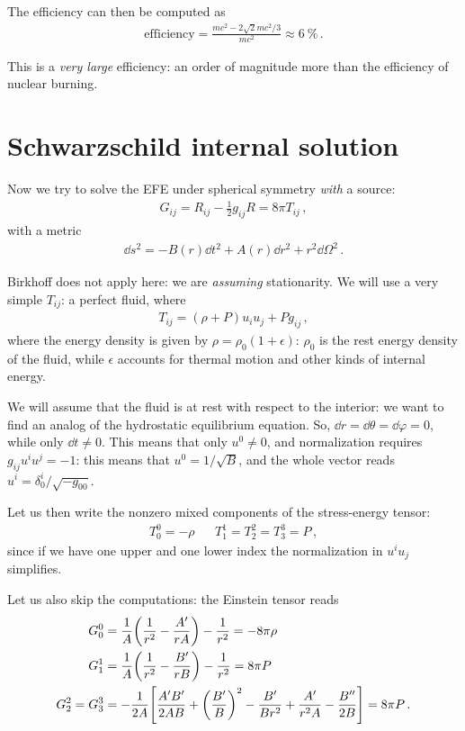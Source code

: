\documentclass[main.tex]{subfiles}
\begin{document}
The efficiency can then be computed as 
%
\begin{align}
\text{efficiency} = \frac{mc^2 - 2 \sqrt{2} mc^2 / 3}{mc^2} \approx \SI{6}{\percent}
\,.
\end{align}

This is a \emph{very large} efficiency: an order of magnitude more than the efficiency of nuclear burning. 

\section{Schwarzschild internal solution}

Now we try to solve the EFE under spherical symmetry \emph{with} a source: 
%
\begin{align}
G_{ij} = R_{ij} - \frac{1}{2} g_{ij} R = 8 \pi T_{ij}
\,,
\end{align}
%
with a metric 
%
\begin{align}
\dd{s^2} = - B(r) \dd{t^2} + A(r) \dd{r^2} + r^2 \dd{\Omega^2}
\,.
\end{align}

Birkhoff does not apply here: we are \emph{assuming} stationarity.
We will use a very simple \(T_{ij}\): a perfect fluid, where 
%
\begin{align}
T_{ij} 
= (\rho + P) u_i u_j + P g_{ij} 
\,,
\end{align}
%
where the energy density is given by \(\rho = \rho_0 ( 1+ \epsilon )\): \(\rho_0\) is the rest energy density of the fluid, while \(\epsilon \) accounts for thermal motion and other kinds of internal energy.

We will assume that the fluid is at rest with respect to the interior: we want to find an analog of the hydrostatic equilibrium equation. 
So, \(\dd{r} = \dd{\theta } = \dd{\varphi } = 0\), while only \(\dd{t} \neq 0\). This means that only \(u^{0} \neq 0\), and normalization requires \(g_{ij} u^{i} u^{j} = -1\): this means that \(u^{0} =  1/ \sqrt{B}\), and the whole vector reads \(u^{i} = \delta^{i}_{0} / \sqrt{-g_{00} }\).

Let us then write the nonzero mixed components of the stress-energy tensor: 
%
\begin{align}
T^{0}_{0} = -\rho && 
T^{1}_{1} = T^{2}_{2} = T^{3}_{3} = P
\,,
\end{align}
%
since if we have one upper and one lower index the normalization in \(u^{i} u_{j}\) simplifies. 

Let us also skip the computations: the Einstein tensor reads 
%
\begin{align}
G^{0}_{0} &= \frac{1}{A} \qty( \frac{1}{r^2} - \frac{A'}{rA}) - \frac{1}{r^2} = - 8 \pi \rho   \\
G^{1}_{1} &= \frac{1}{A} \qty( \frac{1}{r^2} - \frac{B'}{rB}) - \frac{1}{r^2} = 8 \pi  P  \\
G^{2}_{2} = G^{3}_{3}  &= - \frac{1}{2A} \qty[\frac{A'B'}{2AB} + \qty(\frac{B'}{B})^2 - \frac{B'}{Br^2} + \frac{A'}{r^2A} - \frac{B''}{2B}] = 8 \pi P
\,.
\end{align}
\end{document}

